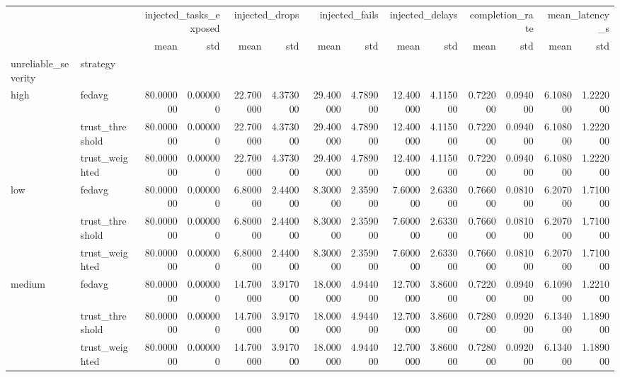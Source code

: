 \begin{tabular}{llrrrrrrrrrrrr}
\toprule
 &  & \multicolumn{2}{r}{injected_tasks_exposed} & \multicolumn{2}{r}{injected_drops} & \multicolumn{2}{r}{injected_fails} & \multicolumn{2}{r}{injected_delays} & \multicolumn{2}{r}{completion_rate} & \multicolumn{2}{r}{mean_latency_s} \\
 &  & mean & std & mean & std & mean & std & mean & std & mean & std & mean & std \\
unreliable_severity & strategy &  &  &  &  &  &  &  &  &  &  &  &  \\
\midrule
\multirow[t]{3}{*}{high} & fedavg & 80.000000 & 0.000000 & 22.700000 & 4.373000 & 29.400000 & 4.789000 & 12.400000 & 4.115000 & 0.722000 & 0.094000 & 6.108000 & 1.222000 \\
 & trust_threshold & 80.000000 & 0.000000 & 22.700000 & 4.373000 & 29.400000 & 4.789000 & 12.400000 & 4.115000 & 0.722000 & 0.094000 & 6.108000 & 1.222000 \\
 & trust_weighted & 80.000000 & 0.000000 & 22.700000 & 4.373000 & 29.400000 & 4.789000 & 12.400000 & 4.115000 & 0.722000 & 0.094000 & 6.108000 & 1.222000 \\
\cline{1-14}
\multirow[t]{3}{*}{low} & fedavg & 80.000000 & 0.000000 & 6.800000 & 2.440000 & 8.300000 & 2.359000 & 7.600000 & 2.633000 & 0.766000 & 0.081000 & 6.207000 & 1.710000 \\
 & trust_threshold & 80.000000 & 0.000000 & 6.800000 & 2.440000 & 8.300000 & 2.359000 & 7.600000 & 2.633000 & 0.766000 & 0.081000 & 6.207000 & 1.710000 \\
 & trust_weighted & 80.000000 & 0.000000 & 6.800000 & 2.440000 & 8.300000 & 2.359000 & 7.600000 & 2.633000 & 0.766000 & 0.081000 & 6.207000 & 1.710000 \\
\cline{1-14}
\multirow[t]{3}{*}{medium} & fedavg & 80.000000 & 0.000000 & 14.700000 & 3.917000 & 18.000000 & 4.944000 & 12.700000 & 3.860000 & 0.722000 & 0.094000 & 6.109000 & 1.221000 \\
 & trust_threshold & 80.000000 & 0.000000 & 14.700000 & 3.917000 & 18.000000 & 4.944000 & 12.700000 & 3.860000 & 0.728000 & 0.092000 & 6.134000 & 1.189000 \\
 & trust_weighted & 80.000000 & 0.000000 & 14.700000 & 3.917000 & 18.000000 & 4.944000 & 12.700000 & 3.860000 & 0.728000 & 0.092000 & 6.134000 & 1.189000 \\
\cline{1-14}
\bottomrule
\end{tabular}
